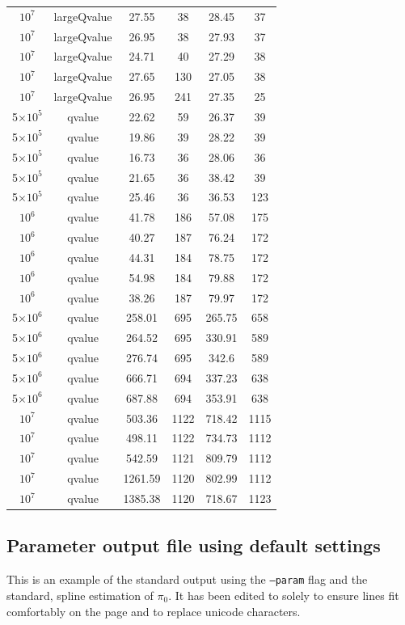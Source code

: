 \documentclass{amsart}
\begin{document}
\begin{center}
\begin{longtable}{cccccc}
    $10^{7}$ & largeQvalue & 27.55 & 38 & 28.45 & 37\\
    $10^{7}$ & largeQvalue & 26.95 & 38 & 27.93 & 37\\
    $10^{7}$ & largeQvalue & 24.71 & 40 & 27.29 & 38\\
    $10^{7}$ & largeQvalue & 27.65 & 130 & 27.05 & 38\\
    $10^{7}$ & largeQvalue & 26.95 & 241 & 27.35 & 25\\
    5$\times10^{5}$ & qvalue & 22.62 & 59 & 26.37 & 39\\
    5$\times10^{5}$ & qvalue & 19.86 & 39 & 28.22 & 39\\
    5$\times10^{5}$ & qvalue & 16.73 & 36 & 28.06 & 36\\
    5$\times10^{5}$ & qvalue & 21.65 & 36 & 38.42 & 39\\
    5$\times10^{5}$ & qvalue & 25.46 & 36 & 36.53 & 123\\
    $10^{6}$ & qvalue & 41.78 & 186 & 57.08 & 175\\
    $10^{6}$ & qvalue & 40.27 & 187 & 76.24 & 172\\
    $10^{6}$ & qvalue & 44.31 & 184 & 78.75 & 172\\
    $10^{6}$ & qvalue & 54.98 & 184 & 79.88 & 172\\
    $10^{6}$ & qvalue & 38.26 & 187 & 79.97 & 172\\
    5$\times10^{6}$ & qvalue & 258.01 & 695 & 265.75 & 658\\
    5$\times10^{6}$ & qvalue & 264.52 & 695 & 330.91 & 589\\
    5$\times10^{6}$ & qvalue & 276.74 & 695 & 342.6 & 589\\
    5$\times10^{6}$ & qvalue & 666.71 & 694 & 337.23 & 638\\
    5$\times10^{6}$ & qvalue & 687.88 & 694 & 353.91 & 638\\
    $10^{7}$ & qvalue & 503.36 & 1122 & 718.42 & 1115\\
    $10^{7}$ & qvalue & 498.11 & 1122 & 734.73 & 1112\\
    $10^{7}$ & qvalue & 542.59 & 1121 & 809.79 & 1112\\
    $10^{7}$ & qvalue & 1261.59 & 1120 & 802.99 & 1112\\
    $10^{7}$ & qvalue & 1385.38 & 1120 & 718.67 & 1123\\
  \end{longtable}
\end{center}


\subsection{Parameter output file using default settings}
\label{sec:suppspline}
This is an example of the standard output using the \texttt{--param} flag and the standard, spline estimation of $\pi_0$. It has been edited to solely to ensure lines fit comfortably on the page and to replace unicode characters.
\end{document}
